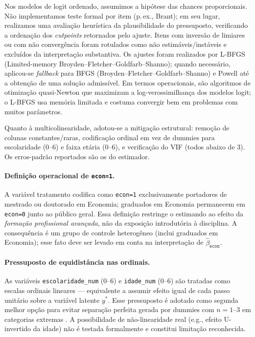 Nos modelos de logit ordenado, assumimos a hipótese das chances proporcionais. Não implementamos teste formal por item (p.\,ex., Brant); em seu lugar, realizamos uma avaliação heurística da plausibilidade do pressuposto, verificando a ordenação dos \textit{cutpoints} retornados pelo ajuste. Itens com inversão de limiares ou com não convergência foram rotulados como não estimáveis/instáveis e excluídos da interpretação substantiva. 
Os ajustes foram realizados por L-BFGS (Limited-memory Broyden–Fletcher–Goldfarb–Shanno); quando necessário, aplicou-se \emph{fallback} para BFGS (Broyden–Fletcher–Goldfarb–Shanno) e Powell até a obtenção de uma solução admissível. 
Em termos operacionais, são algoritmos de otimização quasi-Newton que maximizam a log-verossimilhança dos modelos logit; o L-BFGS usa memória limitada e costuma convergir bem em problemas com muitos parâmetros.

Quanto à multicolinearidade, adotou-se a mitigação estrutural: remoção de colunas constantes/raras, codificação ordinal em vez de dummies para escolaridade (0–6) e faixa etária (0–6), e verificação do VIF (todos abaixo de 3). Os erros-padrão reportados são os do estimador.

\paragraph{Definição operacional de \texttt{econ=1}.}
A variável tratamento codifica como \texttt{econ=1} exclusivamente portadores de mestrado ou doutorado em Economia; graduados em Economia permanecem em \texttt{econ=0} junto ao público geral. Essa definição restringe o estimando ao efeito da \emph{formação profissional avançada}, não da exposição introdutória à disciplina. A consequência é um grupo de controle heterogêneo (inclui graduados em Economia); esse fato deve ser levado em conta na interpretação de $\hat{\beta}_\texttt{econ}$.

\paragraph{Pressuposto de equidistância nas ordinais.}
As variáveis \texttt{escolaridade\_num} (0–6) e \texttt{idade\_num} (0–6) são tratadas como escalas ordinais lineares — equivalente a assumir efeito igual de cada passo unitário sobre a variável latente $y^*$. Esse pressuposto é adotado como segunda melhor opção para evitar separação perfeita gerada por dummies com $n=1$--$3$ em categorias extremas \citep{wooldridge2010}. A possibilidade de não-linearidade real (e.g., efeito U-invertido da idade) não é testada formalmente e constitui limitação reconhecida.

